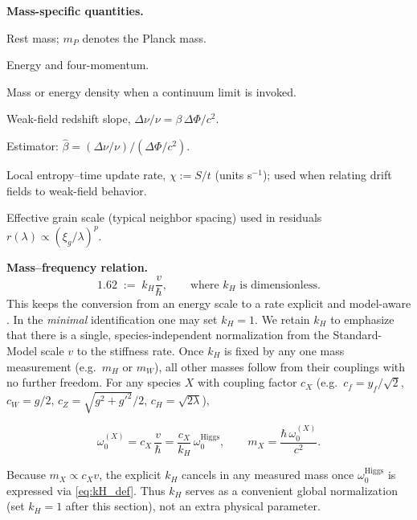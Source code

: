 \noindent\textbf{Mass-specific quantities.}
\begin{description}[leftmargin=2.4em,labelsep=0.8em]
  \item[\(m\)] Rest mass; \(m_P\) denotes the Planck mass.
  \item[\(E=mc^2,\,p^\mu\)] Energy and four-momentum.
  \item[\(\rho\)] Mass or energy density when a continuum limit is invoked.
  \item[\(\beta\)] Weak-field redshift slope, \(\Delta\nu/\nu = \beta\,\Delta\Phi/c^2.\)
  \item[\(\hat\beta\)] Estimator: \(\hat\beta = (\Delta\nu/\nu)\big/(\Delta\Phi/c^2).\)
  \item[\(\chi\)] Local entropy–time update rate, \(\chi := S/t\) (units s\(^{-1}\)); used when relating drift fields to weak-field behavior.
  \item[\(\xi_g\)] Effective grain scale (typical neighbor spacing) used in residuals \(r(\lambda)\propto(\xi_g/\lambda)^p.\)
\end{description}

\bigskip
\noindent\textbf{Mass–frequency relation.}
\begin{equation}
  1.62 \;:=\; k_H \frac{v}{\hbar},
  \qquad \text{where $k_H$ is dimensionless.}
  \label{eq:kH_def}
\end{equation}
This keeps the conversion from an energy scale to a rate explicit and model-aware \cite{tiesinga2021codata}.
In the \emph{minimal} identification one may set \(k_H=1\).
We retain \(k_H\) to emphasize that there is a single, species-independent normalization from the Standard-Model scale \(v\) to the stiffness rate.
Once \(k_H\) is fixed by any one mass measurement (e.g.\ \(m_H\) or \(m_W\)), all other masses follow from their couplings with no further freedom.
For any species \(X\) with coupling factor \(c_X\) (e.g.\ \(c_f=y_f/\sqrt{2}\), \(c_W=g/2\), \(c_Z=\sqrt{g^2+g'^2}/2\), \(c_H=\sqrt{2\lambda}\)),

\begin{equation}
  \omega_0^{(X)}
    = c_X\,\frac{v}{\hbar}
    = \frac{c_X}{k_H}\,\omega_0^{\mathrm{Higgs}},
  \qquad
  m_X
    = \frac{\hbar\,\omega_0^{(X)}}{c^2}.
  \label{eq:species_w0_general}
\end{equation}

Because \(m_X\propto c_X v\), the explicit \(k_H\) cancels in any measured mass once \(\omega_0^{\mathrm{Higgs}}\) is expressed via \eqref{eq:kH_def}.
Thus \(k_H\) serves as a convenient global normalization (set \(k_H=1\) after this section), not an extra physical parameter.

